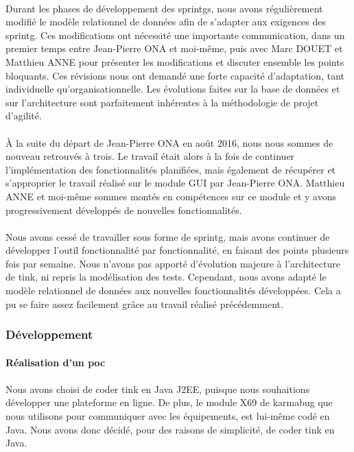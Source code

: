 \documentclass[12pt,a4paper]{report}
\begin{document}
\paragraph*{}Durant les phases de développement des \gls{sprintg}s, nous avons régulièrement modifié le modèle relationnel de données afin de s’adapter aux exigences des \gls{sprintg}. Ces modifications ont nécessité une importante communication, dans un premier temps entre Jean-Pierre ONA et moi-même, puis avec Marc DOUET et Matthieu ANNE pour présenter les modifications et discuter ensemble les points bloquants. Ces révisions nous ont demandé une forte capacité d’adaptation, tant individuelle qu’organisationnelle. Les évolutions faites sur la base de données et sur l'architecture sont parfaitement inhérentes à la méthodologie de projet d’agilité.
\paragraph*{}À la suite du départ de Jean-Pierre ONA en août 2016, nous nous sommes de nouveau retrouvés à trois. Le travail était alors à la fois de continuer l'implémentation des fonctionnalités planifiées, mais également de récupérer et s'approprier le travail réalisé sur le module GUI par Jean-Pierre ONA. Matthieu ANNE et moi-même sommes montés en compétences sur ce module et y avons progressivement développés de nouvelles fonctionnalités.
\paragraph*{}Nous avons cessé de travailler sous forme de \gls{sprintg}, mais avons continuer de développer l'outil fonctionnalité par fonctionnalité, en faisant des points plusieurs fois par semaine. Nous n'avons pas apporté d'évolution majeure à l'architecture de \gls{tink}, ni repris la modélisation des tests. Cependant, nous avons adapté le modèle relationnel de données aux nouvelles fonctionnalités développées. Cela a pu se faire assez facilement grâce au travail réalisé précédemment. \\

\subsubsection{Développement}
\paragraph{Réalisation d'un \gls{poc}}
\paragraph*{}Nous avons choisi de coder \gls{tink} en Java J2EE, puisque nous souhaitions développer une plateforme en ligne. De plus, le module X69 de \gls{karmabug} que nous utilisons pour communiquer avec les équipements, est lui-même codé en Java. Nous avons donc décidé, pour des raisons de simplicité, de coder \gls{tink} en Java.
\end{document}
